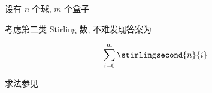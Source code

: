 设有 \(n\) 个球, \(m\) 个盒子

考虑第二类 Stirling 数, 不难发现答案为

\[
    \sum_{i=0}^m\stirlingsecond{n}{i}
\]

求法参见 
